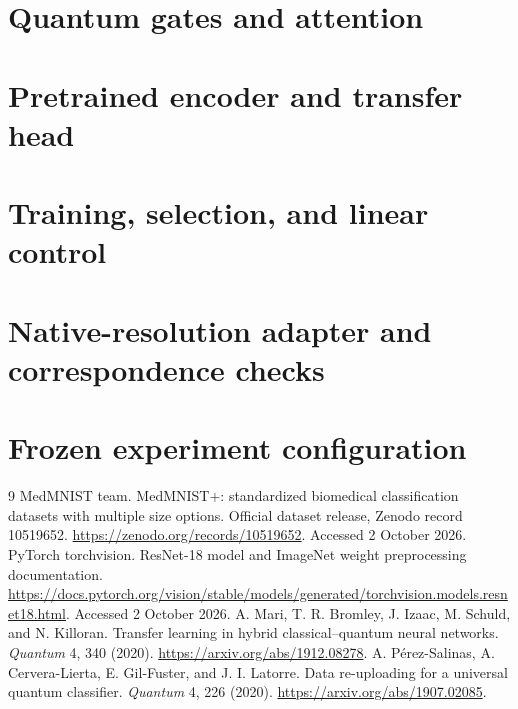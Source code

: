 \documentclass[11pt,a4paper]{report}
\begin{document}
\section{Quantum gates and attention}

\section{Pretrained encoder and transfer head}

\section{Training, selection, and linear control}

\section{Native-resolution adapter and correspondence checks}

\section{Frozen experiment configuration}


\begin{thebibliography}{9}
 MedMNIST team. MedMNIST+: standardized biomedical classification datasets with multiple size options. Official dataset release, Zenodo record 10519652. \url{https://zenodo.org/records/10519652}. Accessed 2 October 2026.
 PyTorch torchvision. ResNet-18 model and ImageNet weight preprocessing documentation. \url{https://docs.pytorch.org/vision/stable/models/generated/torchvision.models.resnet18.html}. Accessed 2 October 2026.
 A. Mari, T. R. Bromley, J. Izaac, M. Schuld, and N. Killoran. Transfer learning in hybrid classical--quantum neural networks. \emph{Quantum} 4, 340 (2020). \url{https://arxiv.org/abs/1912.08278}.
 A. P\'erez-Salinas, A. Cervera-Lierta, E. Gil-Fuster, and J. I. Latorre. Data re-uploading for a universal quantum classifier. \emph{Quantum} 4, 226 (2020). \url{https://arxiv.org/abs/1907.02085}.
\end{thebibliography}
\end{document}

